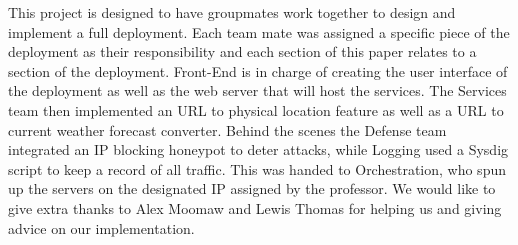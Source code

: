 This project is designed to have groupmates work together to design and implement a full deployment. Each team mate was assigned a specific piece of the deployment as their responsibility and each section of this paper relates to a section of the deployment. Front-End is in charge of creating the user interface of the deployment as well as the web server that will host the services. The Services team then implemented an URL to physical location feature as well as a URL to current weather forecast converter. Behind the scenes the Defense team integrated an IP blocking honeypot to deter attacks, while Logging used a Sysdig script to keep a record of all traffic. This was handed to Orchestration, who spun up the servers on the designated IP assigned by the professor. We would like to give extra thanks to Alex Moomaw and Lewis Thomas for helping us and giving advice on our implementation.
